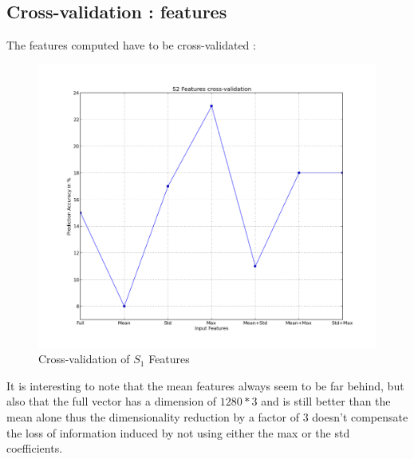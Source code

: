 \documentclass[a4paper]{report}
\begin{document}
\subsection{Cross-validation : features}
The features computed have to be cross-validated :
\begin{figure}[H]
\begin{center}
\includegraphics[scale=0.20]{S1_cross.png}\caption{Cross-validation of $S_1$ Features}\label{figure4}
\end{center}
\end{figure}
It is interesting to note that the mean features always seem to be far behind, but also that the full vector has a dimension of $1280*3$ and is still better than the mean alone thus the dimensionality reduction by a factor of $3$ doesn't compensate the loss of information induced by not using either the max or the std coefficients.\\
\end{document}
